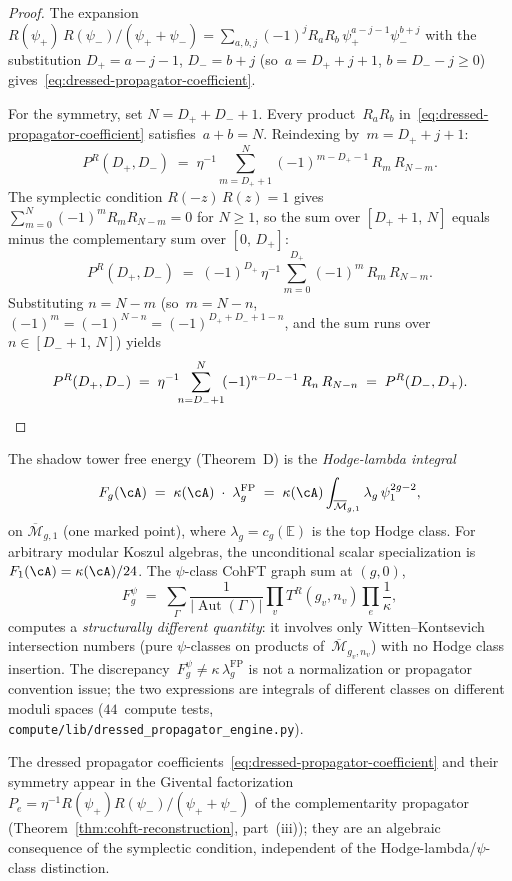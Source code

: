 \begin{proof}
The expansion
$R(\psi_+)\,R(\psi_-)/(\psi_+ + \psi_-)
= \sum_{a,b,j} (-1)^j R_a R_b\,\psi_+^{a-j-1}\psi_-^{b+j}$
with the substitution $D_+ = a-j-1$, $D_- = b+j$
(so~$a = D_+ + j + 1$, $b = D_- - j \geq 0$)
gives~\eqref{eq:dressed-propagator-coefficient}.

For the symmetry, set $N = D_+ + D_- + 1$.
Every product~$R_a R_b$ in~\eqref{eq:dressed-propagator-coefficient}
satisfies~$a + b = N$.
Reindexing by~$m = D_+ + j + 1$:
\[
P^R(D_+, D_-)
\;=\;\eta^{-1}
\!\!\sum_{m=D_++1}^{N}\!
(-1)^{m - D_+ - 1}\, R_m\, R_{N-m}.
\]
The symplectic condition
$R(-z)\,R(z) = 1$ gives
$\sum_{m=0}^{N}(-1)^m R_m R_{N-m} = 0$
for $N \geq 1$,
so the sum over $[D_++1,\,N]$ equals minus the
complementary sum over $[0,\,D_+]$:
\[
P^R(D_+, D_-)
\;=\;
(-1)^{D_+}\,\eta^{-1}
\sum_{m=0}^{D_+}
(-1)^m\, R_m\, R_{N-m}.
\]
Substituting $n = N - m$
(so~$m = N - n$, $(-1)^m = (-1)^{N-n}
= (-1)^{D_+ + D_-+1-n}$, and the sum runs
over $n \in [D_-+1,\,N]$) yields
\[
P^R(D_+, D_-)
\;=\;\eta^{-1}
\!\!\sum_{n=D_-+1}^{N}\!
(-1)^{n - D_- - 1}\, R_n\, R_{N-n}
\;=\;
P^R(D_-, D_+). \qedhere
\]
\end{proof}

\begin{remark}
\label{rem:dressed-propagator-convention}
The shadow tower free energy (Theorem~D) is the
\emph{Hodge-lambda integral}
\begin{equation}\label{eq:hodge-lambda-integral}
F_g(\cA)
\;=\;
\kappa(\cA)
\;\cdot\;
\lambda_g^{\mathrm{FP}}
\;=\;
\kappa(\cA)
\int_{\overline{\mathcal{M}}_{g,1}}
\lambda_g\,\psi_1^{2g-2},
\end{equation}
on $\overline{\mathcal{M}}_{g,1}$ (one marked point), where $\lambda_g =
c_g(\mathbb{E})$ is the top Hodge class.  For arbitrary modular
Koszul algebras, the unconditional scalar specialization is
$F_1(\cA)=\kappa(\cA)/24$.  The $\psi$-class CohFT
graph sum at $(g,0)$,
\[
F_g^{\psi}
\;=\;
\sum_\Gamma
\frac{1}{|\!\operatorname{Aut}(\Gamma)|}
\prod_v T^R(g_v, n_v)
\prod_e \frac{1}{\kappa},
\]
computes a \emph{structurally different quantity}: it involves
only Witten--Kontsevich intersection numbers (pure $\psi$-classes
on products of~$\overline{\mathcal{M}}_{g_v,n_v}$) with no
Hodge class insertion.
The discrepancy~$F_g^{\psi} \neq
\kappa\,\lambda_g^{\mathrm{FP}}$ is not a normalization
or propagator convention issue; the two expressions are integrals
of different classes on different moduli spaces
\textup{(}$44$~compute
tests, \texttt{compute/lib/dressed\_propagator\_engine.py}\textup{)}.

The dressed propagator
coefficients~\eqref{eq:dressed-propagator-coefficient} and
their symmetry appear in the Givental factorization
$P_e = \eta^{-1} R(\psi_+)R(\psi_-)/(\psi_+ + \psi_-)$ of
the complementarity propagator
\textup{(}Theorem~\ref{thm:cohft-reconstruction}, part~(iii)\textup{)};
they are an algebraic consequence of the symplectic condition,
independent of the Hodge-lambda\slash $\psi$-class distinction.
\end{remark}

